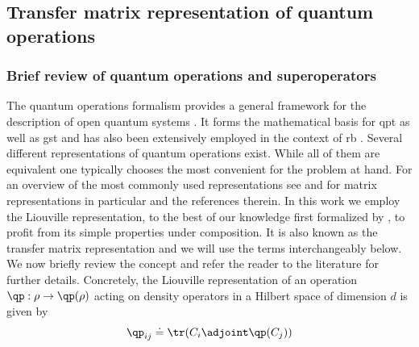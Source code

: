 \subsection{Transfer matrix representation of quantum operations}\label{sec:theory:transfer_matrix}
\subsubsection{Brief review of quantum operations and superoperators}
The quantum operations formalism provides a general framework for the description of open quantum systems \cite{Kraus1983,NielsenChuang2011}. It forms the mathematical basis for \gls{qpt} \cite{Chuang1997,Poyatos1997} as well as \gls{gst} \cite{Blume-Kohout2013,Greenbaum2015} and has also been extensively employed in the context of \gls{rb} \cite{Magesan2012,Kimmel2014}. Several different representations of quantum operations exist. While all of them are equivalent one typically chooses the most convenient for the problem at hand. For an overview of the most commonly used representations see  and for matrix representations in particular  and the references therein. In this work we employ the Liouville representation, to the best of our knowledge first formalized by \citeauthor{Fano1957}, to profit from its simple properties under composition. It is also known as the transfer matrix representation and we will use the terms interchangeably below. We now briefly review the concept and refer the reader to the literature for further details. Concretely, the Liouville representation of an operation $\qp: \rho\rightarrow\qp(\rho)$ acting on density operators in a Hilbert space \Hspace of dimension $d$ is given by
\begin{equation}\label{eq:liouville_representation}
    \qp_{ij}\doteq\tr(C_i\adjoint\qp(C_j))
\end{equation}

